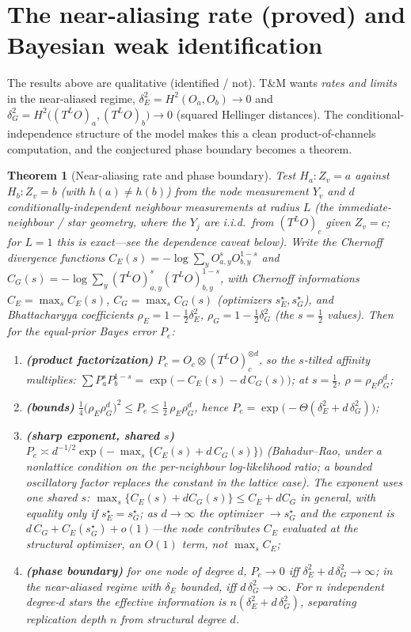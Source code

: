 \documentclass[11pt]{article}
\newtheorem{theorem}{Theorem}
\begin{document}
\section{The near-aliasing rate (proved) and Bayesian weak identification}
The results above are qualitative (identified / not). T\&M wants \emph{rates and limits} in the near-aliased
regime, $\delta_E^2=H^2(O_a,O_b)\to0$ and $\delta_G^2=H^2\big((T^{L}O)_a,(T^{L}O)_b\big)\to0$
(squared Hellinger distances). The conditional-independence structure of the model makes this a clean product-of-channels
computation, and the conjectured phase boundary becomes a theorem.

\begin{theorem}[Near-aliasing rate and phase boundary]\label{thm:rate}
Test $H_a\!:Z_v=a$ against $H_b\!:Z_v=b$ (with $h(a)\neq h(b)$) from the node measurement $Y_v$ and $d$
\emph{conditionally-independent} neighbour measurements at radius $L$ (the immediate-neighbour / star geometry,
where the $Y_j$ are i.i.d.\ from $(T^{L}O)_c$ given $Z_v=c$; for $L=1$ this is exact---see the dependence caveat
below). Write the Chernoff \emph{divergence functions}
$C_E(s)=-\log\sum_y O_{a,y}^{s}O_{b,y}^{1-s}$ and $C_G(s)=-\log\sum_y (T^{L}O)_{a,y}^{s}(T^{L}O)_{b,y}^{1-s}$,
with Chernoff informations $C_E=\max_s C_E(s)$, $C_G=\max_s C_G(s)$ (optimizers $s_E^\star,s_G^\star$), and
Bhattacharyya coefficients $\rho_E=1-\tfrac12\delta_E^2$, $\rho_G=1-\tfrac12\delta_G^2$ (the $s{=}\tfrac12$ values).
Then for the equal-prior Bayes error $P_e$:
\begin{enumerate}[label=(\alph*),leftmargin=*,itemsep=0pt]
\item \textbf{(product factorization)} $P_c=O_c\otimes(T^{L}O)_c^{\otimes d}$, so the $s$-tilted affinity
multiplies: $\sum P_a^{s}P_b^{1-s}=\exp\!\big(-C_E(s)-d\,C_G(s)\big)$; at $s{=}\tfrac12$, $\rho=\rho_E\rho_G^{d}$;
\item \textbf{(bounds)} $\tfrac14\big(\rho_E\rho_G^{d}\big)^{2}\le P_e\le \tfrac12\,\rho_E\rho_G^{d}$, hence
$P_e=\exp\!\big(-\Theta(\delta_E^2+d\,\delta_G^2)\big)$;
\item \textbf{(sharp exponent, shared $s$)}
$P_e\asymp d^{-1/2}\exp\!\big(-\max_{s}\{C_E(s)+d\,C_G(s)\}\big)$ (Bahadur--Rao, under a nonlattice condition on
the per-neighbour log-likelihood ratio; a bounded oscillatory factor replaces the constant in the lattice case).
The exponent uses \emph{one shared} $s$: $\max_s\{C_E(s)+dC_G(s)\}\le C_E+dC_G$ in general, with equality only if
$s_E^\star=s_G^\star$; as $d\to\infty$ the optimizer $\to s_G^\star$ and the exponent is
$d\,C_G+C_E(s_G^\star)+o(1)$---the node contributes $C_E$ evaluated at the \emph{structural} optimizer, an $O(1)$
term, not $\max_s C_E$;
\item \textbf{(phase boundary)} for one node of degree $d$, $P_e\to0$ iff $\delta_E^2+d\,\delta_G^2\to\infty$; in
the near-aliased regime with $\delta_E$ bounded, iff $d\,\delta_G^2\to\infty$. For $n$ independent degree-$d$ stars
the effective information is $n(\delta_E^2+d\,\delta_G^2)$, separating \emph{replication depth} $n$ from
\emph{structural degree} $d$.
\end{enumerate}
\end{theorem}
\end{document}
